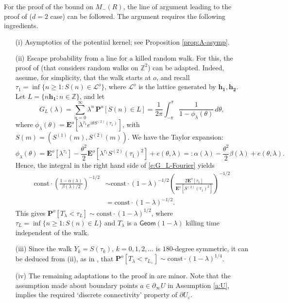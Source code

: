 \documentclass[11pt]{article}
\theoremstyle{remark}
\def\eps{\varepsilon}
\def\E{\mathbf{E}}
\def\Pr{\mathbf{P}}
\def\cL{\mathcal{L}}
\newcommand{\eqnsplst}[1]{\begin{equation*}\begin{split}%
   #1\end{split}\end{equation*}}
\begin{document}
For the proof of the bound on $M_-(R)$, the line of argument leading to the proof of
\cite[Theorem 2.5.2]{Lawler-book-intersections} ($d=2$ case) can be followed. The argument 
requires the following ingredients.
\begin{itemize}
\item[(i)] Asymptotics of the potential kernel; see Proposition \ref{prop:A-asymp}.
\item[(ii)] Escape probability from a line for a killed random walk. For this, the proof 
 of \cite[Proposition 3.1]{Fukai-halfline} (that considers random walks on $\mathbb{Z}^2$)
 can be adapted. Indeed, assume, for 
 simplicity, that the walk starts at $o$, and recall 
 $\tau_1 =  \inf \{ n \ge 1 : S(n) \in \cL^o \}$, where $\cL^o$ is the lattice generated
 by $\mathbf{h_1,h_2}$. Let $L = \{ n \mathbf{h_1} : n \in \mathbb{Z} \}$, and let
 \begin{equation}
 \label{e:G_L-Fourier}
    G_L(\lambda)
    = \sum_{n=0}^\infty \lambda^n \, \Pr^o [ S(n) \in L ]
    = \frac{1}{2 \pi} \int_{-\pi}^\pi \frac{1}{1 - \phi_\lambda(\theta)} \, d\theta,
 \end{equation}  
 where $\phi_\lambda(\theta) = \E^o [ \lambda^{\tau_1} e^{i \theta S^{(2)}(\tau_1)} ]$, with
 $S(m) = (S^{(1)}(m), S^{(2)}(m))$. We have the Taylor expansion: 
 \[ \phi_\lambda(\theta)
    = \E^o [ \lambda^{\tau_1} ] 
      - \frac{\theta^2}{2} \E^o [ \lambda^{\tau_1} S^{(2)}(\tau_1)^2 ] + e(\theta,\lambda)
    =: \alpha(\lambda) - \frac{\theta^2}{2} \beta(\lambda) + e(\theta,\lambda). \]
 Hence, the integral in the right hand side of \eqref{e:G_L-Fourier} yields
 \eqnsplst{ 
    \mathrm{const} \cdot \left( \frac{1 - \alpha(\lambda)}{\beta(\lambda)/2} \right)^{-1/2} 
    &\sim \mathrm{const} \cdot (1 - \lambda)^{-1/2} \left( \frac{2 \E^o [ \tau_1 ]}{\E^o [ S^{(2)}(\tau_1)^2 ]} \right)^{-1/2} \\
    &= \mathrm{const} \cdot (1 - \lambda)^{-1/2}. }
 This gives $\Pr^o [ T_\lambda < \tau_L ] \sim \mathrm{const} \cdot (1 - \lambda)^{1/2}$, 
 where $\tau_L = \inf \{ n \ge 1 : S(n) \in L \}$ and $T_\lambda$ is a $\mathsf{Geom}(1 - \lambda)$
 killing time independent of the walk.
\item[(iii)] Since the walk $Y_k = S(\tau_k)$, $k = 0, 1, 2, \dots$ is $180$-degree symmetric,
 it can be deduced from (ii), as in \cite{Lawler-book-intersections,Fukai-halfline}, that 
 $\Pr^o [ T_\lambda < \tau_{L_+} ] \sim \mathrm{const} \cdot (1 - \lambda)^{1/4}$.
\item[(iv)] The remaining adaptations to the proof in \cite{Lawler-book-intersections} 
 are minor. Note that the assumption made about boundary points
 $a \in \partial_\infty U$ in Assumption \ref{a:U}, implies the required 
 `discrete connectivity' property of $\partial U_\eps$.
\end{itemize}
\end{document}
